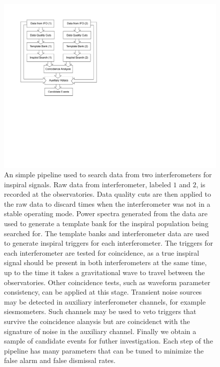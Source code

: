 \begin{figure}[htb]
\label{f:simple_pipe}
\begin{center}
\includegraphics[width=\linewidth]{figures/pipeline/simple_pipe}
\end{center}
\caption{%
An simple pipeline used to search data from two interferometers for inspiral
signals. Raw data from interferometer, labeled $1$ and $2$, is recorded at the
observatories. Data quality cuts are then applied to the raw data to discard
times when the interferometer was not in a stable operating mode. Power
spectra generated from the data are used to generate a template bank for the
inspiral population being searched for. The template banks and interferometer
data are used to generate inspiral triggers for each interferometer. The
triggers for each interferometer are tested for coincidence, as a true
inspiral signal should be present in both interferometers at the same time, up
to the time it takes a gravitational wave to travel between the observatories.
Other coincidence tests, such as waveform parameter consistency, can be
applied at this stage. Transient noise sources may be detected in auxiliary
interferometer channels, for example siesmometers. Such channels may be used to 
veto triggers that survive the coincidence alanysis but are coincidenct with
the signature of noise in the auxiliary channel. Finally we obtain a sample of
candidate events for futher investigation. Each step of the pipeline has many
parameters that can be tuned to minimize the false alarm and false dismissal 
rates.  
}
\end{figure}

